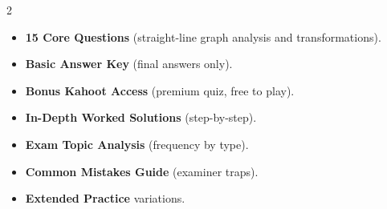 \documentclass[11pt,a4paper]{article}
\newcommand{\FullReleaseDate}{April 30, 2026}
\begin{document}
\vspace{8pt}

\begin{multicols}{2}
  \begin{tcolorbox}[card, title=\sffamily\bfseries\textcolor{white}{\faHandPointDown\ TODAY (Simplified Version)}, colbacktitle=mainblue, boxed title style={sharp corners, boxrule=0pt}]
    \begin{itemize}[leftmargin=1.2em, itemsep=2pt]
      \item \small \textbf{15 Core Questions} (straight-line graph analysis and transformations).
      \item \small \textbf{Basic Answer Key} (final answers only).
      \item \small \textbf{Bonus Kahoot Access} (premium quiz, free to play).
    \end{itemize}
  \end{tcolorbox}

  \columnbreak

  \begin{tcolorbox}[card, title=\sffamily\bfseries\textcolor{white}{\faRocket\ ON \FullReleaseDate\ (Full Upgrade)}, colbacktitle=mainblue, boxed title style={sharp corners, boxrule=0pt}]
    \begin{itemize}[leftmargin=1.2em, itemsep=2pt]
      \item \small \textbf{In-Depth Worked Solutions} (step-by-step).
      \item \small \textbf{Exam Topic Analysis} (frequency by type).
      \item \small \textbf{Common Mistakes Guide} (examiner traps).
      \item \small \textbf{Extended Practice} variations.
    \end{itemize}
  \end{tcolorbox}
\end{multicols}
\end{document}
